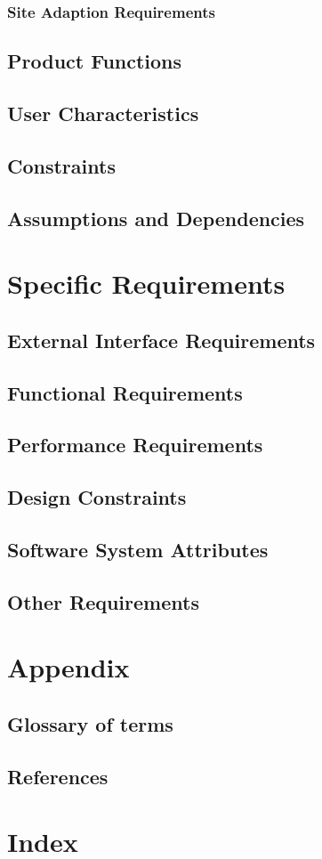 \documentclass[a4paper,12pt]{article}
\begin{document}
\subsubsection{Site Adaption Requirements}

\subsection{Product Functions}

\subsection{User Characteristics}

\subsection{Constraints}

\subsection{Assumptions and Dependencies}

\section{Specific Requirements}
\subsection{External Interface Requirements}

\subsection{Functional Requirements}

\subsection{Performance Requirements}

\subsection{Design Constraints}

\subsection{Software System Attributes}

\subsection{Other Requirements}

\section{Appendix}
\subsection{Glossary of terms}
\subsection{References}
\section{Index}
\end{document}
